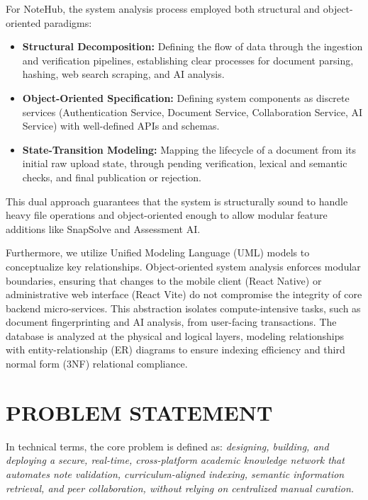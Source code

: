 \documentclass[12,Times new Roman,a4paper]{report}
\begin{document}
For NoteHub, the system analysis process employed both structural and object-oriented paradigms:
\begin{itemize}
    \item \textbf{Structural Decomposition:} Defining the flow of data through the ingestion and verification pipelines, establishing clear processes for document parsing, hashing, web search scraping, and AI analysis.
    \item \textbf{Object-Oriented Specification:} Defining system components as discrete services (Authentication Service, Document Service, Collaboration Service, AI Service) with well-defined APIs and schemas.
    \item \textbf{State-Transition Modeling:} Mapping the lifecycle of a document from its initial raw upload state, through pending verification, lexical and semantic checks, and final publication or rejection.
\end{itemize}
This dual approach guarantees that the system is structurally sound to handle heavy file operations and object-oriented enough to allow modular feature additions like SnapSolve and Assessment AI.

Furthermore, we utilize Unified Modeling Language (UML) models to conceptualize key relationships. Object-oriented system analysis enforces modular boundaries, ensuring that changes to the mobile client (React Native) or administrative web interface (React Vite) do not compromise the integrity of core backend micro-services. This abstraction isolates compute-intensive tasks, such as document fingerprinting and AI analysis, from user-facing transactions. The database is analyzed at the physical and logical layers, modeling relationships with entity-relationship (ER) diagrams to ensure indexing efficiency and third normal form (3NF) relational compliance.

\section{PROBLEM STATEMENT}
In technical terms, the core problem is defined as: \textit{designing, building, and deploying a secure, real-time, cross-platform academic knowledge network that automates note validation, curriculum-aligned indexing, semantic information retrieval, and peer collaboration, without relying on centralized manual curation.}
\end{document}
